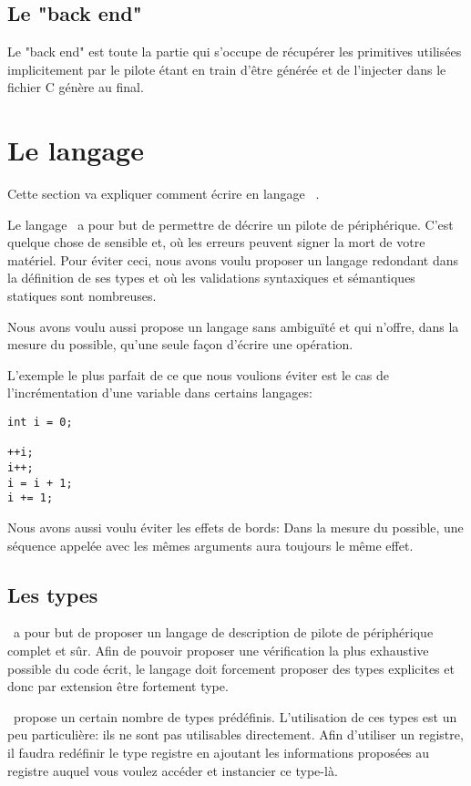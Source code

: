 \documentclass{rtxreport}
\begin{document}
\section{Le "back end"}

Le "back end" est toute la partie qui s'occupe de récupérer les primitives utilisées implicitement par
le pilote étant en train d'être générée et de l'injecter dans le fichier C génère au final.

\chapter{Le langage}

Cette section va expliquer comment écrire en langage \rtx\ .

Le langage \rtx\  a pour but de permettre de décrire un pilote de périphérique.
C'est quelque chose de sensible et, où les erreurs peuvent signer la mort de votre matériel.
Pour éviter ceci, nous avons voulu proposer un langage redondant dans la définition de ses types
et où les validations syntaxiques et sémantiques statiques sont nombreuses.

Nous avons voulu aussi propose un langage sans ambiguïté et qui n'offre, dans la mesure du possible,
qu'une seule façon d'écrire une opération.

L'exemple le plus parfait de ce que nous voulions éviter est le cas de l'incrémentation d'une variable dans certains
langages:

\lstset{language=C++}
\begin{lstlisting}
int i = 0;

++i;
i++;
i = i + 1;
i += 1;
\end{lstlisting}

\lstset{language=rathaxes}

Nous avons aussi voulu éviter les effets de bords:
Dans la mesure du possible, une séquence appelée avec les mêmes arguments aura toujours le même effet.

\section{Les types}
\rtx\  a pour but de proposer un langage de description de pilote de
périphérique complet et sûr.  Afin de pouvoir proposer une vérification la plus
exhaustive possible du code écrit, le langage doit forcement proposer des types
explicites et donc par extension être fortement type.

\rtx\  propose un certain nombre de types prédéfinis. L'utilisation de ces
types est un peu particulière: ils ne sont pas utilisables directement. Afin
d'utiliser un registre, il faudra redéfinir le type registre en ajoutant les
informations proposées au registre auquel vous voulez accéder et instancier ce
type-là.
\end{document}

